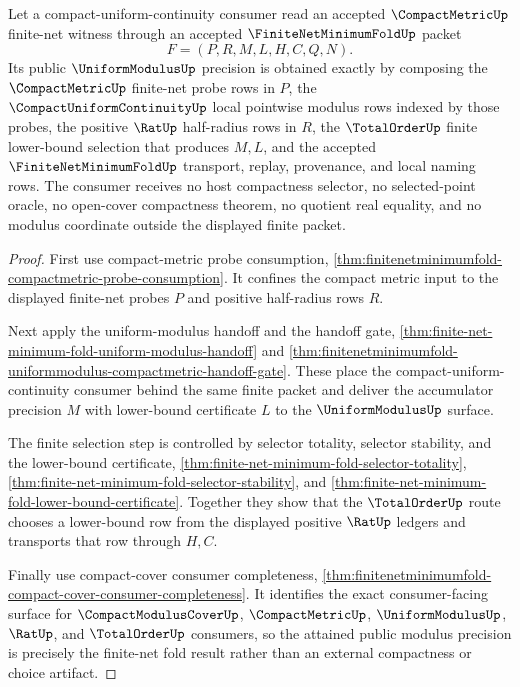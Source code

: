 \begin{theorem}
\label{thm:finite-net-minimum-fold-compact-modulus-attainment}
Let a compact-uniform-continuity consumer read an accepted $\CompactMetricUp$ finite-net witness through an accepted $\FiniteNetMinimumFoldUp$ packet
$$
F=(P,R,M,L,H,C,Q,N).
$$
Its public $\UniformModulusUp$ precision is obtained exactly by composing the $\CompactMetricUp$ finite-net probe rows in $P$, the $\CompactUniformContinuityUp$ local pointwise modulus rows indexed by those probes, the positive $\RatUp$ half-radius rows in $R$, the $\TotalOrderUp$ finite lower-bound selection that produces $M,L$, and the accepted $\FiniteNetMinimumFoldUp$ transport, replay, provenance, and local naming rows. The consumer receives no host compactness selector, no selected-point oracle, no open-cover compactness theorem, no quotient real equality, and no modulus coordinate outside the displayed finite packet.
\end{theorem}
\begin{proof}
First use compact-metric probe consumption, \autoref{thm:finitenetminimumfold-compactmetric-probe-consumption}. It confines the compact metric input to the displayed finite-net probes $P$ and positive half-radius rows $R$.

Next apply the uniform-modulus handoff and the handoff gate, \autoref{thm:finite-net-minimum-fold-uniform-modulus-handoff} and \autoref{thm:finitenetminimumfold-uniformmodulus-compactmetric-handoff-gate}. These place the compact-uniform-continuity consumer behind the same finite packet and deliver the accumulator precision $M$ with lower-bound certificate $L$ to the $\UniformModulusUp$ surface.

The finite selection step is controlled by selector totality, selector stability, and the lower-bound certificate, \autoref{thm:finite-net-minimum-fold-selector-totality}, \autoref{thm:finite-net-minimum-fold-selector-stability}, and \autoref{thm:finite-net-minimum-fold-lower-bound-certificate}. Together they show that the $\TotalOrderUp$ route chooses a lower-bound row from the displayed positive $\RatUp$ ledgers and transports that row through $H,C$.

Finally use compact-cover consumer completeness, \autoref{thm:finitenetminimumfold-compact-cover-consumer-completeness}. It identifies the exact consumer-facing surface for $\CompactModulusCoverUp$, $\CompactMetricUp$, $\UniformModulusUp$, $\RatUp$, and $\TotalOrderUp$ consumers, so the attained public modulus precision is precisely the finite-net fold result rather than an external compactness or choice artifact.
\end{proof}

